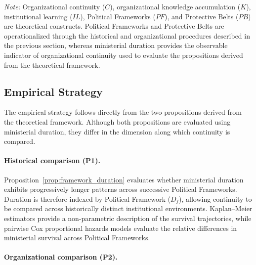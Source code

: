 \documentclass[doc, 12pt, a4paper,floatsintext]{apa7}
\begin{document}
\begin{table}[!htbp]
\begin{tabularx}{\textwidth}{p{3.3cm}Xp{2.0cm}}
\bottomrule
\end{tabularx}

\vspace{0.2cm}

\begin{minipage}{0.97\textwidth}
\footnotesize
\textit{Note:} Organizational continuity ($C$), organizational knowledge accumulation ($K$), institutional learning ($IL$), Political Frameworks ($PF$), and Protective Belts ($PB$) are theoretical constructs. Political Frameworks and Protective Belts are operationalized through the historical and organizational procedures described in the previous section, whereas ministerial duration provides the observable indicator of organizational continuity used to evaluate the propositions derived from the theoretical framework.


\end{minipage}

\end{table}
%
\subsection{Empirical Strategy}

The empirical strategy follows directly from the two propositions derived from the theoretical framework. Although both propositions are evaluated using ministerial duration, they differ in the dimension along which continuity is compared.

\paragraph{Historical comparison (P1).}

Proposition~\ref{prop:framework_duration} evaluates whether ministerial duration exhibits progressively longer patterns across successive Political Frameworks. Duration is therefore indexed by Political Framework ($D_f$), allowing continuity to be compared across historically distinct institutional environments. Kaplan--Meier estimators provide a non-parametric description of the survival trajectories, while pairwise Cox proportional hazards models evaluate the relative differences in ministerial survival across Political Frameworks.

\paragraph{Organizational comparison (P2).}
\end{document}
